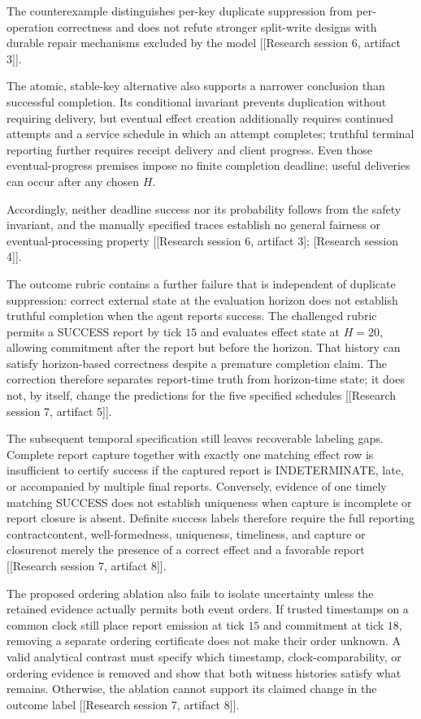 \documentclass[11pt]{article}
\begin{document}
The counterexample distinguishes per-key duplicate suppression from per-operation correctness and does not refute stronger split-write designs with durable repair mechanisms excluded by the model [[Research session 6, artifact 3]].

The atomic, stable-key alternative also supports a narrower conclusion than successful completion. Its conditional invariant prevents duplication without requiring delivery, but eventual effect creation additionally requires continued attempts and a service schedule in which an attempt completes; truthful terminal reporting further requires receipt delivery and client progress. Even those eventual-progress premises impose no finite completion deadline: useful deliveries can occur after any chosen $H$.

Accordingly, neither deadline success nor its probability follows from the safety invariant, and the manually specified traces establish no general fairness or eventual-processing property [[Research session 6, artifact 3]; [Research session 4]].

The outcome rubric contains a further failure that is independent of duplicate suppression: correct external state at the evaluation horizon does not establish truthful completion when the agent reports success. The challenged rubric permits a SUCCESS report by tick $15$ and evaluates effect state at $H=20$, allowing commitment after the report but before the horizon. That history can satisfy horizon-based correctness despite a premature completion claim. The correction therefore separates report-time truth from horizon-time state; it does not, by itself, change the predictions for the five specified schedules [[Research session 7, artifact 5]].

The subsequent temporal specification still leaves recoverable labeling gaps. Complete report capture together with exactly one matching effect row is insufficient to certify success if the captured report is INDETERMINATE, late, or accompanied by multiple final reports. Conversely, evidence of one timely matching SUCCESS does not establish uniqueness when capture is incomplete or report closure is absent. Definite success labels therefore require the full reporting contract\textemdash{}content, well-formedness, uniqueness, timeliness, and capture or closure\textemdash{}not merely the presence of a correct effect and a favorable report [[Research session 7, artifact 8]].

The proposed ordering ablation also fails to isolate uncertainty unless the retained evidence actually permits both event orders. If trusted timestamps on a common clock still place report emission at tick $15$ and commitment at tick $18$, removing a separate ordering certificate does not make their order unknown. A valid analytical contrast must specify which timestamp, clock-comparability, or ordering evidence is removed and show that both witness histories satisfy what remains. Otherwise, the ablation cannot support its claimed change in the outcome label [[Research session 7, artifact 8]].
\end{document}
